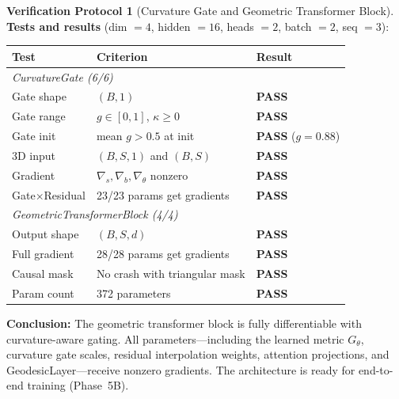 \documentclass[11pt,a4paper]{article}
\theoremstyle{definition}
\newtheorem{protocol}[theorem]{Verification Protocol}
\theoremstyle{remark}
\begin{document}
\begin{protocol}[Curvature Gate and Geometric Transformer Block]
\textbf{Tests and results} (dim $= 4$, hidden $= 16$, heads $= 2$, 
batch $= 2$, seq $= 3$):
\begin{center}
\begin{tabular}{lll}
\toprule
Test & Criterion & Result \\
\midrule
\multicolumn{3}{l}{\emph{CurvatureGate (6/6)}} \\
Gate shape & $(B,1)$ & \textbf{PASS} \\
Gate range & $g \in [0,1]$, $\kappa \geq 0$ & \textbf{PASS} \\
Gate init & mean $g > 0.5$ at init & \textbf{PASS} ($g = 0.88$) \\
3D input & $(B,S,1)$ and $(B,S)$ & \textbf{PASS} \\
Gradient & $\nabla_s, \nabla_b, \nabla_\theta$ nonzero & \textbf{PASS} \\
Gate$\times$Residual & 23/23 params get gradients & \textbf{PASS} \\
\midrule
\multicolumn{3}{l}{\emph{GeometricTransformerBlock (4/4)}} \\
Output shape & $(B,S,d)$ & \textbf{PASS} \\
Full gradient & 28/28 params get gradients & \textbf{PASS} \\
Causal mask & No crash with triangular mask & \textbf{PASS} \\
Param count & 372 parameters & \textbf{PASS} \\
\bottomrule
\end{tabular}
\end{center}
\textbf{Conclusion:} The geometric transformer block is fully 
differentiable with curvature-aware gating. All parameters---including 
the learned metric $G_\theta$, curvature gate scales, residual 
interpolation weights, attention projections, and GeodesicLayer---receive 
nonzero gradients. The architecture is ready for end-to-end training 
(Phase~5B).
\end{protocol}
\end{document}
